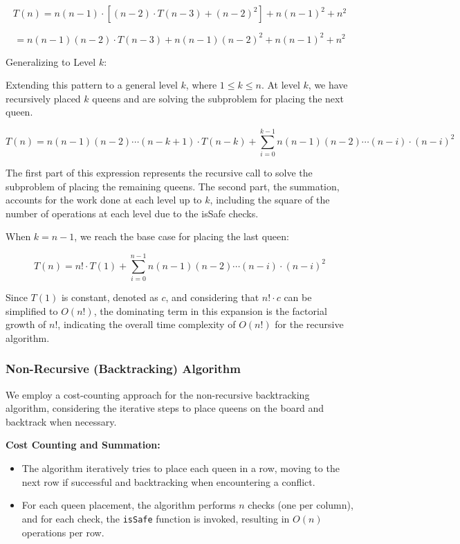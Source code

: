 \documentclass{article}
\begin{document}
\[T(n) = n(n-1) \cdot [(n-2) \cdot T(n-3) + (n-2)^2] + n(n-1)^2 + n^2\]

\[= n(n-1)(n-2) \cdot T(n-3) + n(n-1)(n-2)^2 + n(n-1)^2 + n^2\]

Generalizing to Level \(k\):

Extending this pattern to a general level \(k\), where \(1 \leq k \leq n\). At level \(k\), we have recursively placed \(k\) queens and are solving the subproblem for placing the next queen.

\[T(n) = n(n-1)(n-2) \cdots (n-k+1) \cdot T(n-k) + \sum_{i=0}^{k-1} n(n-1)(n-2) \cdots (n-i) \cdot (n-i)^2\]

The first part of this expression represents the recursive call to solve the subproblem of placing the remaining queens. The second part, the summation, accounts for the work done at each level up to \(k\), including the square of the number of operations at each level due to the isSafe checks.

When \(k = n-1\), we reach the base case for placing the last queen:

\[T(n) = n! \cdot T(1) + \sum_{i=0}^{n-1} n(n-1)(n-2) \cdots (n-i) \cdot (n-i)^2\]

Since \(T(1)\) is constant, denoted as \(c\), and considering that \(n! \cdot c\) can be simplified to \(O(n!)\), the dominating term in this expansion is the factorial growth of \(n!\), indicating the overall time complexity of \(O(n!)\) for the recursive algorithm.


\subsubsection*{Non-Recursive (Backtracking) Algorithm}
We employ a cost-counting approach for the non-recursive backtracking
algorithm, considering the iterative steps to place queens on the board
and backtrack when necessary.

\textbf{Cost Counting and Summation:}

\begin{itemize}
    \item The algorithm iteratively tries to place each queen in a row, moving to the next row if successful and backtracking when encountering a conflict.
    \item For each queen placement, the algorithm performs $n$ checks (one per column), and for each check, the \texttt{isSafe} function is invoked, resulting in $O(n)$ operations per row.
\end{itemize}
\end{document}
